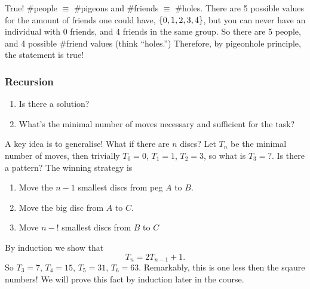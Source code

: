 \documentclass{report}
\begin{document}
\sol True! \#people $\equiv$ \#pigeons and \#friends $\equiv$ \#holes. There are 5 possible values for the amount of friends one could have, $\left\lbrace 0, 1, 2, 3, 4 \right\rbrace$, but you can never have an individual with 0 friends, and 4 friends in the same group. So there are 5 people, and 4 possible \#friend values (think ``holes.'') Therefore, by pigeonhole principle, the statement is true!


\subsubsection*{Recursion}
\begin{enumerate}
	\item Is there a solution?
	\item What's the minimal number of moves necessary and sufficient for the task?
\end{enumerate}
A key idea is to generalise! What if there are $n$ discs? Let $T_n$ be the minimal number of moves, then trivially $T_0 = 0$, $T_1 = 1$, $T_2 = 3$, so what is $T_3 = ?$. Is there a pattern? The winning strategy is
\begin{enumerate}
	\item Move the $n-1$ smallest discs from peg $A$ to $B$.
	\item Move the big disc from $A$ to $C$.
	\item Move $n-!$ smallest discs from $B$ to $C$
\end{enumerate}
By induction we show that
$$
	T_n = 2T_{n-1} + 1.
$$
So $T_3 = 7$, $T_4 = 15$, $T_5 = 31$, $T_6 = 63$. Remarkably, this is one less then the sqaure numbers! We will prove this fact by induction later in the course.
\end{document}
